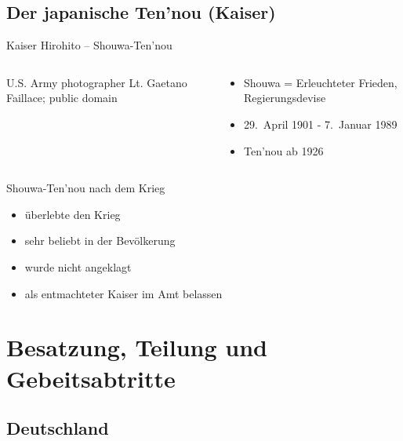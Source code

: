 \subsection[Der Ten’nou]{Der japanische Ten’nou (Kaiser)}

\begin{frame}{Kaiser Hirohito -- Shouwa-Ten’nou}
	\begin{columns}
		\begin{column}{0.6\textwidth}
			{U.S. Army photographer Lt. Gaetano Faillace; public domain}
		\end{column}
		\begin{column}{0.39\textwidth}
			\begin{itemize}
				\item Shouwa = Erleuchteter Frieden, Regierungsdevise
				\pause
				\item 29.\ April 1901 - 7.\ Januar 1989
				\item Ten’nou ab 1926
			\end{itemize}
		\end{column}
	\end{columns}
\end{frame}


\begin{frame}{Shouwa-Ten’nou nach dem Krieg}
	\begin{itemize}
		\item überlebte den Krieg
		\pause
		\item sehr beliebt in der Bevölkerung
		\pause
		\item wurde nicht angeklagt
		\item als entmachteter Kaiser im Amt belassen
	\end{itemize}
\end{frame}

\section{Besatzung, Teilung und Gebeitsabtritte}

\subsection{Deutschland}

